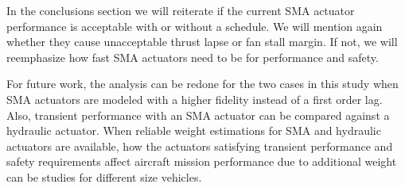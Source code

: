 
In the conclusions section we will reiterate if the current SMA actuator 
performance is acceptable with or without a schedule. We will mention again 
whether they cause unacceptable thrust lapse or fan stall margin. If not, we will 
reemphasize how fast SMA actuators need to be for performance and safety.

For future work, the analysis can be redone for the two cases in this study when
SMA actuators are modeled with a higher fidelity instead of a first order lag. 
Also, transient performance with an SMA actuator can be compared against a 
hydraulic actuator. When reliable weight estimations for SMA and hydraulic 
actuators are available, how the actuators satisfying transient performance and
safety requirements affect aircraft mission performance due to additional weight
can be studies for different size vehicles.